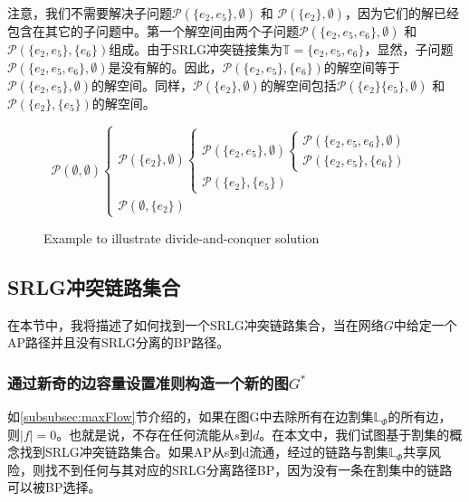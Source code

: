 注意，我们不需要解决子问题${{\mathcal{P}}(\{ e_2,e_5\}, \emptyset)}$ 和 ${{\mathcal{P}}(\{ e_2\},\emptyset )}$，因为它们的解已经包含在其它的子问题中。第一个解空间由两个子问题${{\mathcal P}(\{ e_2,e_5,e_6\} ,\emptyset )}$ 和 ${{\mathcal P}(\{ e_2,e_5\} ,\{ e_6\} )}$组成。由于SRLG冲突链接集为$\mathbb{T}=\{e_2,e_5,e_6\}$，显然，子问题${{\mathcal P}(\{ e_2,e_5,e_6\} ,\emptyset )}$是没有解的。因此，${{\mathcal P}(\{ e_2,e_5\} ,\{ e_6\} )}$的解空间等于${{\mathcal{P}}(\{ e_2, e_5\}, \emptyset)}$的解空间。同样，${{\mathcal{P}}(\{ e_2\},\emptyset )}$的解空间包括${{\mathcal{P}}(\{ e_2\} \{ e_5\}, \emptyset)}$  和 ${{\mathcal{P}}(\{ e_2\} ,\{ e_5\} )}$的解空间。
\begin{figure}[htbp]
\small{
\begin{equation*}
{\mathcal P}(\emptyset ,\emptyset )\left\{ {\begin{array}{*{20}{l}}
{{\mathcal P}(\{ e_2\} ,\emptyset )\left\{ {\begin{array}{*{20}{l}}
{{\mathcal P}(\{ e_2,e_5\} ,\emptyset )\left\{ {\begin{array}{*{20}{l}}
{{\mathcal P}(\{ e_2,e_5,e_6\} ,\emptyset )}\\
{\boxed{{\mathcal P}(\{ e_2,e_5\} ,\{ e_6\} )}}
\end{array}} \right.}\\
{\boxed{{\mathcal P}(\{ e_2\} ,\{ e_5\} )}}
\end{array}} \right.}\\
{\boxed{{\mathcal P}(\emptyset ,\{ e_2\} )}}
\end{array}} \right.
\end{equation*}
}
\caption{Example to illustrate divide-and-conquer solution}
\label{fig:DividedConquer}
\end{figure}




\subsection{SRLG冲突链路集合}
在本节中，我将描述了如何找到一个SRLG冲突链路集合，当在网络$G$中给定一个AP路径并且没有SRLG分离的BP路径。
\subsubsection{通过新奇的边容量设置准则构造一个新的图$G^*$}
如\ref{subsubsec:maxFlow}节介绍的，如果在图G中去除所有在边割集$\mathbb{\mathbb{L}}_{\Phi}$的所有边，则$|f| = 0$。也就是说，不存在任何流能从$s$到$d$。在本文中，我们试图基于割集的概念找到SRLG冲突链路集合。如果AP从s到d流通，经过的链路与割集$\mathbb{\mathbb{L}}_{\Phi}$共享风险，则找不到任何与其对应的SRLG分离路径BP，因为没有一条在割集中的链路可以被BP选择。

